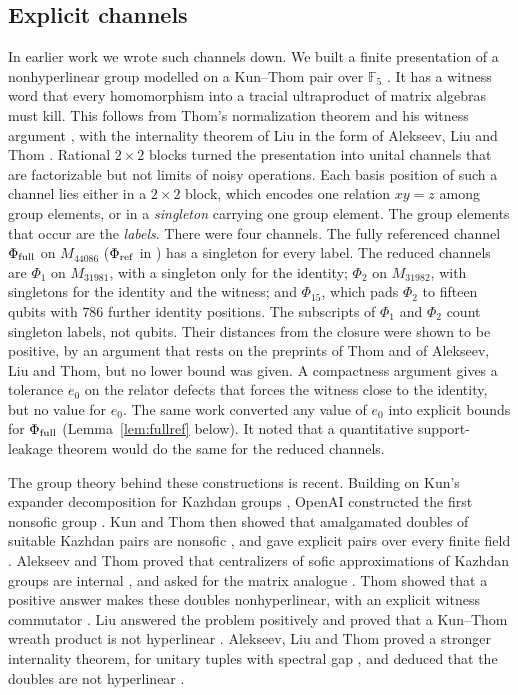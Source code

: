 \documentclass[11pt]{article}
\begin{document}
\subsection{Explicit channels}
In earlier work \cite{MghirbiDouglasV1} we wrote such channels down.  We built a finite presentation of a nonhyperlinear group modelled on a Kun--Thom pair over $\mathbb F_5$ \cite{KunThom26}.  It has a witness word that every homomorphism into a tracial ultraproduct of matrix algebras must kill.  This follows from Thom's normalization theorem and his witness argument \cite[Theorem~1.2 and Section~5.2]{Thom26}, with the internality theorem of Liu \cite[Theorem~1.2]{Liu26} in the form of Alekseev, Liu and Thom \cite[Theorem~B]{AlekseevLiuThom26}.  Rational $2\times2$ blocks turned the presentation into unital channels that are factorizable but not limits of noisy operations.  Each basis position of such a channel lies either in a $2\times2$ block, which encodes one relation $xy=z$ among group elements, or in a \emph{singleton} carrying one group element.  The group elements that occur are the \emph{labels}.  There were four channels.  The fully referenced channel $\Phi_{\rm full}$ on $M_{44086}$ ($\Phi_{\rm ref}$ in \cite{MghirbiDouglasV1}) has a singleton for every label.  The reduced channels are $\Phi_1$ on $M_{31981}$, with a singleton only for the identity; $\Phi_2$ on $M_{31982}$, with singletons for the identity and the witness; and $\Phi_{15}$, which pads $\Phi_2$ to fifteen qubits with $786$ further identity positions.  The subscripts of $\Phi_1$ and $\Phi_2$ count singleton labels, not qubits.  Their distances from the closure were shown to be positive, by an argument that rests on the preprints of Thom and of Alekseev, Liu and Thom, but no lower bound was given.  A compactness argument gives a tolerance $e_0$ on the relator defects that forces the witness close to the identity, but no value for $e_0$.  The same work converted any value of $e_0$ into explicit bounds for $\Phi_{\rm full}$ (Lemma~\ref{lem:fullref} below).  It noted that a quantitative support-leakage theorem would do the same for the reduced channels.

The group theory behind these constructions is recent.  Building on Kun's expander decomposition for Kazhdan groups \cite[Theorem~1]{Kun16}, OpenAI constructed the first nonsofic group \cite{OpenAI26}.  Kun and Thom then showed that amalgamated doubles of suitable Kazhdan pairs are nonsofic \cite[Theorems~A and~4.1]{KunThom26}, and gave explicit pairs over every finite field \cite[Theorem~E]{KunThom26}.  Alekseev and Thom proved that centralizers of sofic approximations of Kazhdan groups are internal \cite[Theorem~3.1]{AlekseevThom26}, and asked for the matrix analogue \cite[Open Problem~6.2(a)]{AlekseevThom26}.  Thom showed that a positive answer makes these doubles nonhyperlinear, with an explicit witness commutator \cite[Theorems~1.2 and~1.3 and Section~5.2]{Thom26}.  Liu answered the problem positively \cite[Theorem~1.2]{Liu26} and proved that a Kun--Thom wreath product is not hyperlinear \cite[Theorem~1.1]{Liu26}.  Alekseev, Liu and Thom proved a stronger internality theorem, for unitary tuples with spectral gap \cite[Theorem~B]{AlekseevLiuThom26}, and deduced that the doubles are not hyperlinear \cite[Corollary~C]{AlekseevLiuThom26}.
\end{document}
